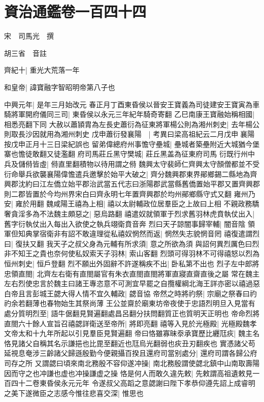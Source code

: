 \chapter{資治通鑑卷一百四十四}
宋　司馬光　撰

胡三省　音註

齊紀十|{
	重光大荒落一年}


和皇帝|{
	諱寶融字智昭明帝第八子也}


中興元年|{
	是年三月始改元}
春正月丁酉東昏侯以晉安王寶義為司徒建安王寶寅為車騎將軍開府儀同三司|{
	東昏侯以永元三年紀年騎奇寄翻}
乙巳南康王寶融始稱相國|{
	相悉亮翻下同}
大赦以蕭頴胄為左長史蕭衍為征東將軍楊公則為湘州刺史|{
	去年楊公則取長沙因就用為湘州刺史}
戊申蕭衍發襄陽　|{
	考異曰梁高祖紀云二月戊申襄陽按戊申正月十三日梁紀誤也}
留弟偉總府州事憺守壘城|{
	壘城者築壘附近大城猶今堡寨也憺徒敢翻又徒濫翻}
府司馬莊丘黑守樊城|{
	莊丘黑盖為征東府司馬}
衍既行州中兵及儲偫皆虛|{
	偫直里翻積物以待用謂之偫}
魏興太守裴師仁齊興太守顏僧都並不受衍命舉兵欲襲襄陽偉憺遣兵邀擊於始平大破之|{
	齊分魏興郡東界鄖鄉錫二縣地為齊興郡沈約曰江左僑立始平郡治武當五代志曰浙陽郡武當縣舊僑置始平郡又置齊興郡則二郡皆置於今均州界宋白曰齊永明七年置齊興郡於均州鄖鄉縣守式又翻}
雍州乃安|{
	雍於用翻}
魏咸陽王禧為上相|{
	禧以太尉輔政位居羣臣之上故曰上相}
不親政務驕奢貪淫多為不法魏主頗惡之|{
	惡烏路翻}
禧遣奴就領軍于烈求舊羽林虎賁執仗出入|{
	舊字衍執仗出入每出入欲使之執兵翊衛賁音奔}
烈曰天子諒闇事歸宰輔|{
	闇音陰}
領軍但知典掌宿衛非有詔不敢違理從私禧奴惘然而返|{
	惘然失志貌惘音罔}
禧復遣謂烈曰|{
	復扶又翻}
我天子之叔父身為元輔有所求須|{
	意之所欲為須}
與詔何異烈厲色曰烈非不知王之貴也奈何使私奴索天子羽林|{
	索山客翻}
烈頭可得羽林不可得禧怒以烈為恒州刺史|{
	恒戶登翻}
烈不願出外固辭不許遂稱疾不出|{
	卧私第不出也}
烈子左中郎將忠領直閤|{
	北齊左右衛有直閤屬官有朱衣直閤直閤將軍直寢直齋直後之屬}
常在魏主左右烈使忠言於魏主曰諸王專恣意不可測宜早罷之自攬權綱北海王詳亦密以禧過惡白帝且言彭城王勰大得人情不宜久輔政|{
	勰音協}
帝然之時將礿祭|{
	宗廟之祭春曰礿礿余若翻薄也春物始生其祭尚薄}
王公並齋於廟東坊帝夜使于忠語烈明旦入見當有處分質明烈至|{
	語牛倨翻見賢遍翻處昌呂翻分扶問翻質正也質明天正明也}
帝命烈將直閤六十餘人宣旨召禧勰詳衛送至帝所|{
	將即亮翻}
禧等入見於光極殿|{
	光極殿魏孝文帝太和十九年所起以引見羣臣見賢遍翻}
帝曰恪雖寡昧沗承寶歷比纒尫疢|{
	魏主名恪見諸父自稱其名示謙挹也比毘至翻近也尫烏光翻弱也疢丑刃翻疾也}
實憑諸父苟延視息奄涉三齡諸父歸遜殷勤今便親攝百揆且還府司當别處分|{
	還府司謂各歸公府司存之所}
又謂勰曰頃來南北務殷不容仰遂冲操|{
	南北務殷謂使勰北鎮中山南取壽陽因而守之也冲謙也虚也冲操謙虚之操}
恪是何人而敢久違先敕|{
	先敕謂高祖遺敕見一百四十二卷東昏侯永元元年}
令遂叔父高蹈之意勰謝曰陛下孝恭仰遵先詔上成睿明之美下遂微臣之志感今惟往悲喜交深|{
	惟思也}
